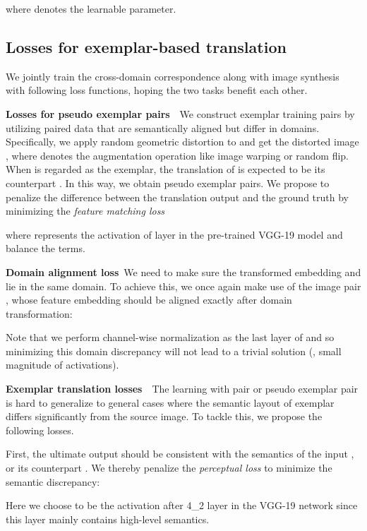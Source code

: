 \documentclass[10pt,twocolumn,letterpaper]{article}
\begin{document}
where  denotes the learnable parameter.

\subsection{Losses for exemplar-based translation}
We jointly train the cross-domain correspondence along with image synthesis with following loss functions, hoping the two tasks benefit each other. 


\vspace{0.4em}
\noindent\textbf{Losses for pseudo exemplar pairs}~~We construct exemplar training pairs by utilizing paired data  that are semantically aligned but differ in domains.
Specifically, we apply random geometric distortion to  and get the distorted image , where  denotes the augmentation operation like image warping or random flip. When  is regarded as the exemplar, the translation of  is expected to be its counterpart . In this way, we obtain pseudo exemplar pairs. We propose to penalize the difference between the translation output and the ground truth  by minimizing the \emph{feature matching loss}~\cite{johnson2016perceptual,isola2017image,chen2017photographic}

where  represents the activation of layer  in the pre-trained VGG-19 model and  balance the terms.

\vspace{0.4em}
\noindent\textbf{Domain alignment loss}~We need to make sure the transformed embedding  and  lie in the same domain. To achieve this, we once again make use of the image pair , whose feature embedding should be aligned exactly after domain transformation: 

Note that we perform channel-wise normalization as the last layer of  and  so minimizing this domain discrepancy will not lead to a trivial solution (\ie, small magnitude of activations).  


\vspace{0.4em}
\noindent\textbf{Exemplar translation losses}~~The learning with pair or pseudo exemplar pair is hard to generalize to general cases where the semantic layout of exemplar differs significantly from the source image. To tackle this, we propose the following losses.

First, the ultimate output should be consistent with the semantics of the input , or its counterpart . We thereby penalize the \emph{perceptual loss} to minimize the semantic discrepancy:

Here we choose  to be the activation after 4\_2 layer in the VGG-19 network since this layer mainly contains high-level semantics. 
\end{document}
